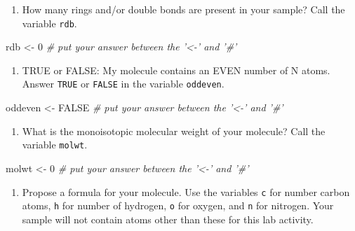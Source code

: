 \documentclass[]{tufte-book}
\newenvironment{Shaded}{}{}
\newcommand{\CommentTok}[1]{\textcolor[rgb]{0.38,0.63,0.69}{\textit{#1}}}
\newcommand{\DecValTok}[1]{\textcolor[rgb]{0.25,0.63,0.44}{#1}}
\newcommand{\NormalTok}[1]{#1}
\newcommand{\OtherTok}[1]{\textcolor[rgb]{0.00,0.44,0.13}{#1}}
\newcommand{\StringTok}[1]{\textcolor[rgb]{0.25,0.44,0.63}{#1}}
\providecommand{\tightlist}{%
  \setlength{\itemsep}{0pt}\setlength{\parskip}{0pt}}
\begin{document}
\begin{enumerate}
\def\labelenumi{\arabic{enumi}.}
\setcounter{enumi}{3}
\tightlist
\item
  How many rings and/or double bonds are present in your sample? Call the variable \texttt{rdb}.
\end{enumerate}

\begin{Shaded}
\begin{Highlighting}[]
\NormalTok{rdb <-}\StringTok{ }\DecValTok{0}     \CommentTok{# put your answer between the '<-' and '#'}
\end{Highlighting}
\end{Shaded}

\begin{enumerate}
\def\labelenumi{\arabic{enumi}.}
\setcounter{enumi}{4}
\tightlist
\item
  TRUE or FALSE: My molecule contains an EVEN number of N atoms. Answer \texttt{TRUE} or \texttt{FALSE} in the variable \texttt{oddeven}.
\end{enumerate}

\begin{Shaded}
\begin{Highlighting}[]
\NormalTok{oddeven <-}\StringTok{ }\OtherTok{FALSE}     \CommentTok{# put your answer between the '<-' and '#'}
\end{Highlighting}
\end{Shaded}

\begin{enumerate}
\def\labelenumi{\arabic{enumi}.}
\setcounter{enumi}{5}
\tightlist
\item
  What is the monoisotopic molecular weight of your molecule? Call the variable \texttt{molwt}.
\end{enumerate}

\begin{Shaded}
\begin{Highlighting}[]
\NormalTok{molwt <-}\StringTok{ }\DecValTok{0}     \CommentTok{# put your answer between the '<-' and '#'}
\end{Highlighting}
\end{Shaded}

\begin{enumerate}
\def\labelenumi{\arabic{enumi}.}
\setcounter{enumi}{6}
\tightlist
\item
  Propose a formula for your molecule. Use the variables \texttt{c} for number carbon atoms, \texttt{h} for number of hydrogen, \texttt{o} for oxygen, and \texttt{n} for nitrogen. Your sample will not contain atoms other than these for this lab activity.
\end{enumerate}
\end{document}
